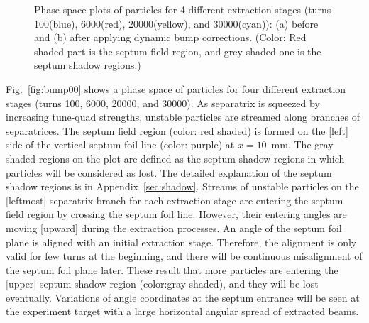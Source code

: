 \documentclass[aps,prstab,onecolumn,preprint,endfloats,11pt]{revtex4-1}
\begin{document}
\begin{figure}[!tbp]
  \caption{\label{fig:bump0}Phase space plots of particles for 4 different extraction stages (turns 100(blue), 6000(red), 20000(yellow), and 30000(cyan)): (a) before and (b) after applying dynamic bump corrections. (Color: Red shaded part is the septum field region, and grey shaded one is the septum shadow regions.)}
\end{figure}

Fig.~\ref{fig:bump00} shows a phase space of particles for four different extraction stages (turns 100, 6000, 20000, and 30000).
As separatrix is squeezed by increasing tune-quad strengths, unstable particles are streamed along branches of separatrices. 
The septum field region (color: red shaded) is formed on the [left] side of the vertical septum foil line (color: purple) at $x=10$~mm. 
The gray shaded regions on the plot are defined as the septum shadow regions in which particles will be considered as lost.
The detailed explanation of the septum shadow regions is in Appendix~\ref{sec:shadow}.
Streams of unstable particles on the [leftmost] separatrix branch for each extraction stage are entering the septum field region by crossing the septum foil line.
However, their entering angles are moving [upward] during the extraction processes.
An angle of the septum foil plane is aligned with an initial extraction stage.
Therefore, the alignment is only valid for few turns at the beginning, and there will be continuous misalignment of the septum foil plane later.
These result that more particles are entering the [upper] septum shadow region (color:gray shaded), and they will be lost eventually.
Variations of angle coordinates at the septum entrance will be seen at the experiment target with a large horizontal angular spread of extracted beams.
\end{document}
